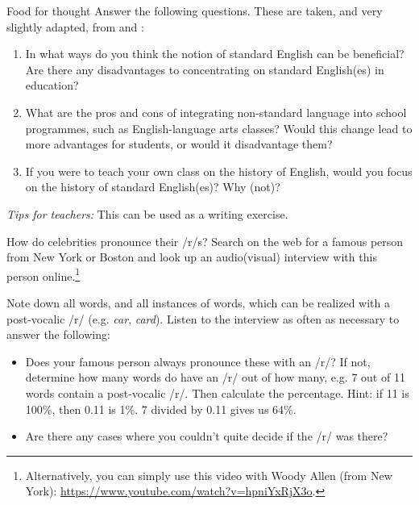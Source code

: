 \begin{exercises}{Food for thought}
Answer the following questions. These are taken, and very slightly adapted, from \citet[52]{Hickey2019} and \citet[289]{Paraskevas2019}:

\begin{enumerate}
\item In what ways do you think the notion of standard English can be beneficial? Are there any disadvantages to concentrating on standard English(es) in education?
\item What are the pros and cons of integrating non-standard language into school programmes, such as English-language arts classes? Would this change lead to more advantages for students, or would it disadvantage them?
\newpage
\item If you were to teach your own class on the history of English, would you focus on the history of standard English(es)? Why (not)?
\end{enumerate}

\noindent \emph{Tips for teachers:} This can be used as a writing exercise.

\end{exercises}

\begin{exercises}{How do celebrities pronounce their /r/s?}\label{exercise-r}
Search on the web for a famous person from New York or Boston and look up an audio(visual) interview with this person online.\footnote{Alternatively, you can simply use this video with Woody Allen (from New York): \url{https://www.youtube.com/watch?v=hpniYxRjX3o}.}

Note down all words, and all instances of words, which can be realized with a post-vocalic /r/ (e.g. \textit{car}, \textit{card}). Listen to the interview as often as necessary to answer the following:
\begin{itemize}
    \item Does your famous person always pronounce these with an /r/? If not, determine how many words do have an /r/ out of how many, e.g. 7 out of 11 words contain a post-vocalic /r/. Then calculate the percentage. Hint: if 11 is 100\%, then 0.11 is 1\%. 7 divided by 0.11 gives us 64\%.
    \item Are there any cases where you couldn’t quite decide if the /r/ was there?
\end{itemize}
	
\end{exercises}

